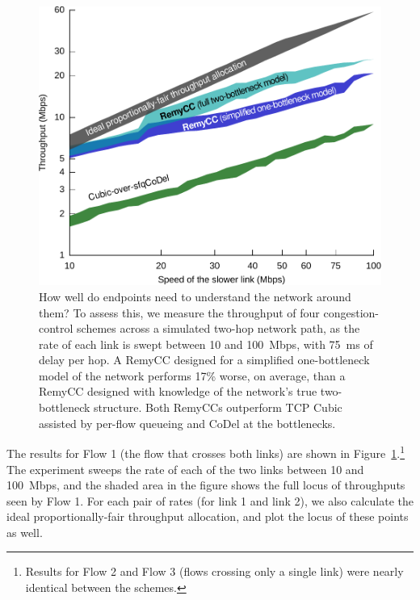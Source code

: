 \begin{figure}[t!]
\includegraphics[width=\columnwidth]{multilink-all.pdf}
\caption{How well do endpoints need to understand the network around
  them? To assess this, we measure the throughput of four
  congestion-control schemes across a simulated two-hop network path,
  as the rate of each link is swept between 10 and 100~Mbps, with
  75~ms of delay per hop. A RemyCC designed for a simplified
  one-bottleneck model of the network performs 17\% worse, on average,
  than a RemyCC designed with knowledge of the network's true
  two-bottleneck structure. Both RemyCCs outperform TCP Cubic assisted
  by per-flow queueing and CoDel at the bottlenecks.}
\label{f:multihop}
\end{figure}

The results for Flow 1 (the flow that crosses both links) are shown in
Figure~\ref{f:multihop}.\footnote{Results for Flow 2 and Flow 3
  (flows crossing only a single link) were nearly identical between
  the schemes.} The experiment sweeps the rate of each of the two
links between 10 and 100~Mbps, and the shaded area in the figure shows
the full locus of throughputs seen by Flow 1. For each pair of rates
(for link 1 and link 2), we also calculate the ideal
proportionally-fair throughput allocation, and plot the locus of these
points as well.


